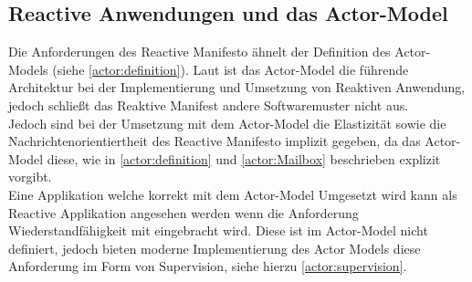 \subsection{Reactive Anwendungen und das Actor-Model}
Die Anforderungen des {Reactive Manifesto} ähnelt der Definition des Actor-Models (siehe \ref{actor:definition}). Laut \cite{Vernon2015ReactiveAkka} ist das Actor-Model die führende Architektur bei der Implementierung und Umsetzung von Reaktiven Anwendung, jedoch schließt das Reaktive Manifest andere Softwaremuster nicht aus. \\
Jedoch sind bei der Umsetzung mit dem Actor-Model die Elastizität sowie die Nachrichtenorientiertheit des {Reactive Manifesto} implizit gegeben, da das Actor-Model diese, wie in \ref{actor:definition} und \ref{actor:Mailbox} beschrieben explizit vorgibt.\\
Eine Applikation welche korrekt mit dem Actor-Model Umgesetzt wird kann als Reactive Applikation angesehen werden wenn die Anforderung {Wiederstandfähigkeit} mit eingebracht wird. Diese ist im Actor-Model nicht definiert, jedoch bieten moderne Implementierung des Actor Models diese Anforderung im Form von {Supervision}, siehe hierzu \ref{actor:supervision}.
